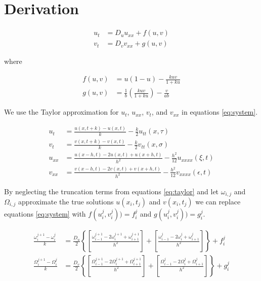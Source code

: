 \section{Derivation}

\begin{subequations} \label{eq:system}
\begin{align}
    u_t &= D_u u_{xx} + f(u,v) \label{eq:prey} \\
    v_t &= D_v v_{xx} + g(u,v) \label{eq:pred}
\end{align}
\end{subequations}

where

\begin{subequations}
\begin{align*}
    f(u,v) &= u(1-u) - \frac{kuv}{1+ku} \\
    g(u,v) &= \frac{1}{b} (\frac{kuv}{1+ku}) - \frac{v}{ab}
\end{align*}
\end{subequations}

We use the Taylor approximation for $u_t$, $u_{xx}$, $v_t$, and
$v_{xx}$ in equations \eqref{eq:system}.

\begin{subequations} \label{eq:taylor}
\begin{align}
    u_t &= \frac{u(x,t+k)-u(x,t)}{k} - \frac{k}{2} u_{tt}(x,\tau) \label{eq:u_t} \\
    v_t &= \frac{v(x,t+k)-v(x,t)}{k} - \frac{k}{2} v_{tt}(x,\sigma) \label{eq:v_t}
    \\
    u_{xx} &= \frac{u(x-h,t)-2u(x,t)+u(x+h,t)}{h^2} - \frac{h^2}{12} u_{xxxx}(\xi,t) \label{eq:u_xx} \\
    v_{xx} &= \frac{v(x-h,t)-2v(x,t)+v(x+h,t)}{h^2} - \frac{h^2}{12} v_{xxxx}(\epsilon,t) \label{eq:v_xx}
\end{align}
\end{subequations}

By neglecting the truncation terms from equations \eqref{eq:taylor} and let
$\omega_{i,j}$ and $\Omega_{i,j}$ approximate the true solutions $u(x_i,t_j)$ and
$v(x_i,t_j)$ we can replace equations \eqref{eq:system} with 
$f(u_i^j,v_i^j)) = f_i^j$ and $g(u_i^j,v_i^j)) = g_i^j$.

\begin{subequations} \label{eq:approx_sys}
\begin{align}
    \frac{\omega_{i}^{j+1} - \omega_{i}^{j}}{k} &=
        \frac{D_u}{2} \left\{
            \left[ \frac{\omega_{i-1}^{j+1}-2\omega_{i}^{j+1}+\omega_{i+1}^{j+1}}{h^2} \right] +
            \left[ \frac{\omega_{i-1}^{j}-2\omega_{i}^{j}+\omega_{i+1}^{j}}{h^2} \right]
        \right\} + f_{i}^{j} \label{eq:approx_prey}
        \\
    \frac{\Omega_{i}^{j+1} - \Omega_{i}^{j}}{k} &=
        \frac{D_v}{2} \left\{
            \left[ \frac{\Omega_{i-1}^{j+1}-2\Omega_{i}^{j+1}+\Omega_{i+1}^{j+1}}{h^2} \right] +
            \left[ \frac{\Omega_{i-1}^{j}-2\Omega_{i}^{j}+\Omega_{i+1}^{j}}{h^2} \right]
        \right\} + g_{i}^{j} \label{eq:approx_pred}
\end{align}
\end{subequations}

